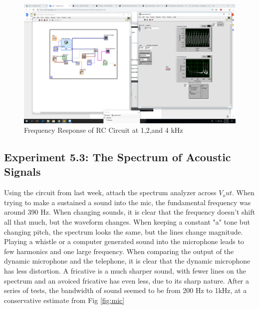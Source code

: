 \documentclass[10pt]{article}
\begin{document}
\begin{centering}
	\begin{figure} [H]
		\centering
		\includegraphics[scale=0.22]{images/124khztransferfunction.png}
		\caption{Frequency Response of RC Circuit at 1,2,and 4 kHz}
		\label{fig:124}
	\end{figure}
\end{centering}



\subsection{Experiment 5.3: The Spectrum of Acoustic Signals}

Using the circuit from last week, attach the spectrum analyzer across $V_out$. When trying to make a sustained a sound into the mic, the fundamental frequency was around 390 Hz. When changing sounds, it is clear that the frequency doesn't shift all that much, but the waveform changes. When keeping a constant "a" tone but changing pitch, the spectrum looks the same, but the lines change magnitude. Playing a whistle or a computer generated sound into the microphone leads to few harmonics and one large frequency. When comparing the output of the dynamic microphone and the telephone, it is clear that the dynamic microphone has less distortion. A fricative is a much sharper sound, with fewer lines on the spectrum and an avoiced fricative has even less, due to its sharp nature. After a series of tests, the bandwidth of sound seemed to be from 200 Hz to 1kHz, at a conservative estimate from Fig \ref{fig:mic}
\end{document}
